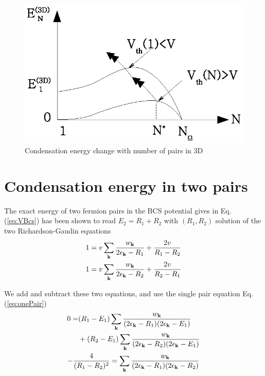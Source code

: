 \documentclass[aps,prb,showpacs,reprint]{revtex4-1}
\begin{document}
\begin{figure}[htb]
	\centering
		\includegraphics{3dCondChange.eps}
	\caption{Condensation energy change with number of pairs in 3D}
	\label{fig:3dCondChange}
\end{figure}

\section{Condensation energy in two pairs\label{sec:twoPair}}
The exact energy of two fermion pairs in the BCS potential gives in Eq. (\ref{eq:VBcs}) has been shown to read $E_2=R_1+R_2$ with $(R_1,R_2)$ solution of the two Richardson-Gaudin equations
\begin{equation}
\begin{split}
1&=v\sum_{\mathbf{k}}\frac{w_{\mathbf{k}}}{2\epsilon_{\mathbf{k}}-R_1}+\frac{2v}{R_1-R_2}\\
1&=v\sum_{\mathbf{k}}\frac{w_{\mathbf{k}}}{2\epsilon_{\mathbf{k}}-R_2}+\frac{2v}{R_2-R_1}
\end{split}
\label{eq:richardsonEq}
\end{equation}

We add and subtract these two equations, and use the single pair equation Eq. (\ref{eq:onePair})
\begin{gather}
\begin{split}
0=&(R_1-E_1)\sum_{\mathbf{k}}\frac{w_{\mathbf{k}}}{(2\epsilon_{\mathbf{k}}-R_1)(2\epsilon_{\mathbf{k}}-E_1)}\\
&+(R_2-E_1)\sum_{\mathbf{k}}\frac{w_{\mathbf{k}}}{(2\epsilon_{\mathbf{k}}-R_2)(2\epsilon_{\mathbf{k}}-E_1)}\label{eq:2PairPlus}
\end{split}\\
-\frac{4}{(R_1-R_2)^2}=\sum_{\mathbf{k}}\frac{w_{\mathbf{k}}}{(2\epsilon_{\mathbf{k}}-R_1)(2\epsilon_{\mathbf{k}}-R_2)}\label{eq:2PairMinus}
\end{gather}
\end{document}
